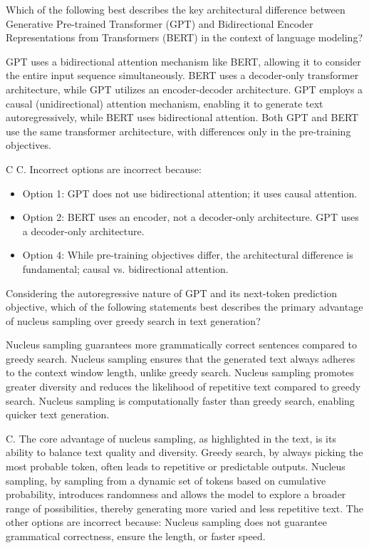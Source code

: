 \documentclass[11pt,addpoints,answers]{exam}
\begin{document}
\begin{questions}
\question[1] Which of the following best describes the key architectural difference between Generative Pre-trained Transformer (GPT) and Bidirectional Encoder Representations from Transformers (BERT) in the context of language modeling?
  \begin{choices}
    \choice GPT uses a bidirectional attention mechanism like BERT, allowing it to consider the entire input sequence simultaneously.
    \choice BERT uses a decoder-only transformer architecture, while GPT utilizes an encoder-decoder architecture.
    \choice GPT employs a causal (unidirectional) attention mechanism, enabling it to generate text autoregressively, while BERT uses bidirectional attention.
    \choice Both GPT and BERT use the same transformer architecture, with differences only in the pre-training objectives.
  \end{choices}
\begin{solution}C
C.
  Incorrect options are incorrect because:
  \begin{itemize}
    \item Option 1: GPT does not use bidirectional attention; it uses causal attention.
    \item Option 2: BERT uses an encoder, not a decoder-only architecture. GPT uses a decoder-only architecture.
    \item Option 4: While pre-training objectives differ, the architectural difference is fundamental; causal vs. bidirectional attention.
  \end{itemize}
\end{solution}

\question[1] Considering the autoregressive nature of GPT and its next-token prediction objective, which of the following statements best describes the primary advantage of nucleus sampling over greedy search in text generation?
  \begin{choices}
    \choice Nucleus sampling guarantees more grammatically correct sentences compared to greedy search.
    \choice Nucleus sampling ensures that the generated text always adheres to the context window length, unlike greedy search.
    \choice Nucleus sampling promotes greater diversity and reduces the likelihood of repetitive text compared to greedy search.
    \choice Nucleus sampling is computationally faster than greedy search, enabling quicker text generation.
  \end{choices}
\begin{solution}
C.
The core advantage of nucleus sampling, as highlighted in the text, is its ability to balance text quality and diversity. Greedy search, by always picking the most probable token, often leads to repetitive or predictable outputs. Nucleus sampling, by sampling from a dynamic set of tokens based on cumulative probability, introduces randomness and allows the model to explore a broader range of possibilities, thereby generating more varied and less repetitive text. The other options are incorrect because: Nucleus sampling does not guarantee grammatical correctness, ensure the length, or faster speed.
\end{solution}


\end{questions}
\end{document}
